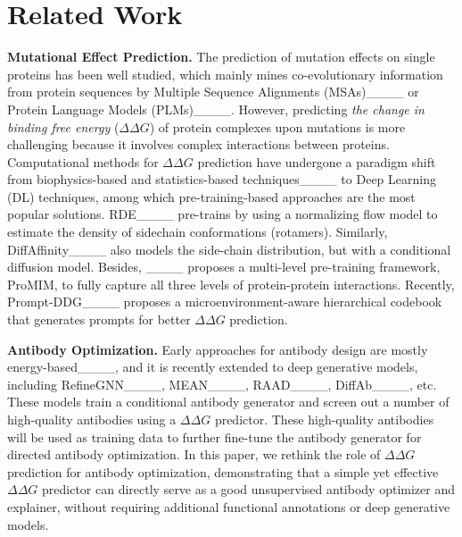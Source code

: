\section{Related Work}
\vspace{-0.3em}
\textbf{Mutational Effect Prediction.}
The prediction of mutation effects on single proteins has been well studied, which mainly mines co-evolutionary information from protein sequences by Multiple Sequence Alignments (MSAs)____ or Protein Language Models (PLMs)____. However, predicting \emph{the change in binding free energy} ($\Delta\Delta G$) of protein complexes upon mutations is more challenging because it involves complex interactions between proteins. Computational methods for $\Delta\Delta G$ prediction have undergone a paradigm shift from biophysics-based and statistics-based techniques____ to Deep Learning (DL) techniques, among which pre-training-based approaches are the most popular solutions. RDE____ pre-trains by using a normalizing flow model to estimate the density of sidechain conformations (rotamers). Similarly, DiffAffinity____ also models the side-chain distribution, but with a conditional diffusion model. Besides, ____ proposes a multi-level pre-training framework, ProMIM, to fully capture all three levels of protein-protein interactions. Recently, Prompt-DDG____ proposes a microenvironment-aware hierarchical codebook that generates prompts for better $\Delta\Delta G$ prediction.

\textbf{Antibody Optimization.} Early approaches for antibody design are mostly energy-based____, and it is recently extended to deep generative models, including RefineGNN____, MEAN____, RAAD____, DiffAb____, etc. These models train a conditional antibody generator and screen out a number of high-quality antibodies using a $\Delta\Delta G$ predictor. These high-quality antibodies will be used as training data to further fine-tune the antibody generator for directed antibody optimization. In this paper, we rethink the role of $\Delta\Delta G$ prediction for antibody optimization, demonstrating that a simple yet effective $\Delta\Delta G$ predictor can directly serve as a good unsupervised antibody optimizer and explainer, without requiring additional functional annotations or deep generative models.


\vspace{-0.5em}